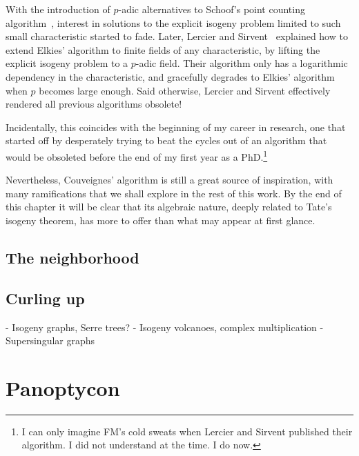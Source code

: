 \documentclass{report}
\theoremstyle{plain}
\theoremstyle{definition}
\begin{document}
With the introduction of $p$-adic alternatives to Schoof's point
counting
algorithm~\cite{satoh00,kedlaya01,kedlaya04,lauder04,10.2307/24522768},
interest in solutions to the explicit isogeny problem limited to such
small characteristic started to fade. %
Later, Lercier and Sirvent~\cite{lercier+sirvent08} explained how to
extend Elkies' algorithm to finite fields of any characteristic, by
lifting the explicit isogeny problem to a $p$-adic field. %
Their algorithm only has a logarithmic dependency in the
characteristic, and gracefully degrades to Elkies' algorithm when $p$
becomes large enough. %
Said otherwise, Lercier and Sirvent effectively rendered all previous
algorithms obsolete! %

Incidentally, this coincides with the beginning of my career in
research, one that started off by desperately trying to beat the
cycles out of an algorithm that would be obsoleted before the end of
my first year as a PhD.\footnote{I can only imagine FM's cold sweats
  when Lercier and Sirvent published their algorithm. I did not
  understand at the time. I do now.}

Nevertheless, Couveignes' algorithm is still a great source of
inspiration, with many ramifications that we shall explore in the rest
of this work. %
By the end of this chapter it will be clear that its algebraic nature,
deeply related to Tate's isogeny theorem, has more to offer than what
may appear at first glance. %

\section{The neighborhood}




\section{Curling up}

- Isogeny graphs, Serre trees?
- Isogeny volcanoes, complex multiplication
- Supersingular graphs


\chapter{Panoptycon}
\label{cha:fpbar}
\end{document}
